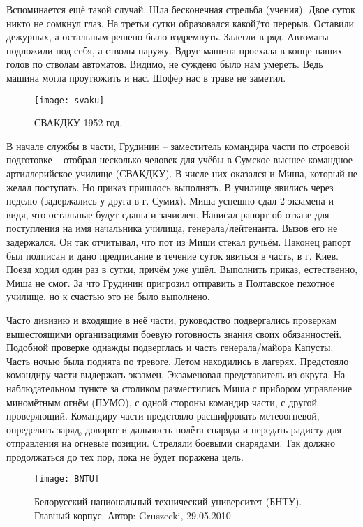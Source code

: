 Вспоминается ещё такой случай. Шла бесконечная стрельба (учения). Двое суток никто не сомкнул глаз. На третьи сутки образовался какой\=/то перерыв. Оставили дежурных, а остальным решено было вздремнуть. Залегли в ряд. Автоматы подложили под себя, а стволы наружу. Вдруг машина проехала в конце наших голов по стволам автоматов. Видимо, не суждено было нам умереть. Ведь машина могла проутюжить и нас. Шофёр нас в траве не заметил.

\begin{wrapfigure}{O}{.4\textwidth}
\centering
\texttt{[image: svaku]}
\caption[СВАКДКУ 1952 год.]{СВАКДКУ 1952 год\footnotemark.}
\label{fig:svaku}
\end{wrapfigure}

В начале службы в части, Грудинин \--- заместитель командира части по строевой подготовке \--- отобрал несколько человек для учёбы в Сумское высшее командное артиллерийское училище (СВАКДКУ). В числе них оказался и Миша, который не желал поступать. Но приказ пришлось выполнять. В училище явились через неделю (задержались у друга в г. Сумих). Миша успешно сдал 2 экзамена и видя, что остальные будут сданы и зачислен. Написал рапорт об отказе для поступления на имя начальника училища, генерала\-/лейтенанта. Вызов его не задержался. Он так отчитывал, что пот из Миши стекал ручьём. Наконец рапорт был подписан и дано предписание в течение суток явиться в часть, в г. Киев. Поезд ходил один раз в сутки, причём уже ушёл. Выполнить приказ, естественно, Миша не смог. За что Грудинин пригрозил отправить в Полтавское пехотное училище, но к счастью это не было выполнено. 

Часто дивизию и входящие в неё части, руководство подвергались проверкам вышестоящими организациями боевую готовность знания своих обязанностей. Подобной проверке однажды подверглась и часть генерала\-/майора Капусты. Часть ночью была поднята по тревоге. Летом находились в лагерях. Предстояло командиру части выдержать экзамен. Экзаменовал представитель из округа. На наблюдательном пункте за столиком разместились Миша с прибором управление миномётным огнём (ПУМО), с одной стороны командир части, с другой проверяющий. Командиру части предстояло расшифровать метеоогневой, определить заряд, доворот и дальность полёта снаряда и передать радисту для отправления на огневые позиции. Стреляли боевыми снарядами. Так должно продолжаться до тех пор, пока не будет поражена цель. 

\begin{wrapfigure}{O}{.4\textwidth}
\centering
\texttt{[image: BNTU]}
\caption{Белорусский национальный технический университет (БНТУ). Главный корпус. Автор: Gruszecki, 29.05.2010}
\label{fig:BNTU}
\end{wrapfigure}

